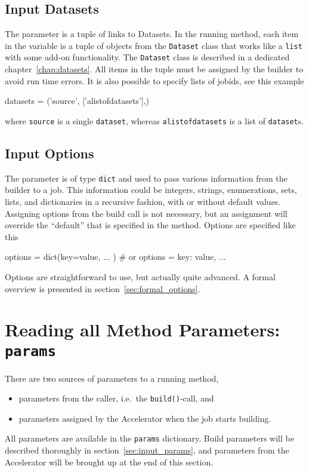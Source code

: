 \subsection*{Input Datasets}
The \datasets parameter is a tuple of links to Datasets.  In the
running method, each item in the \datasets variable is a tuple of
objects from the \texttt{Dataset} class that works like
a \texttt{list} with some add-on functionality.  The \texttt{Dataset}
class is described in a dedicated chapter~\ref{chap:datasets}.
All items in the \datasets tuple must be assigned by the builder to
avoid run time errors.
It is also possible to specify lists of jobids, see this example
\begin{python}
datasets = ('source', ['alistofdatasets'],)
\end{python}
where \texttt{source} is a single \texttt{dataset}, whereas
\texttt{alistofdatasets} is a list of \texttt{dataset}s.




\subsection*{Input Options}

The \options parameter is of type \texttt{dict} and used to pass
various information from the builder to a job.  This information could
be integers, strings, enumerations, sets, lists, and dictionaries in a
recursive fashion, with or without default values.  Assigning options
from the build call is not necessary, but an assignment will override
the ``default'' that is specified in the method.  Options are
specified like this
\begin{python}
  options = dict(key=value, ... )  # or
  options = {key: value, ...}
\end{python}

Options are straightforward to use, but actually quite advanced.  A
formal overview is presented in section~\ref{sec:formal_options}.





\section{Reading all Method Parameters:  \texttt{params}}
\label{sec:params}

There are two sources of parameters to a running method,
\begin{itemize}
\item [] parameters from the caller, i.e.\ the \texttt{build()}-call, and
\item [] parameters assigned by the Accelerator when the job starts building.
\end{itemize}
All parameters are available in the \texttt{params} dictionary.  Build
parameters will be described thoroughly in
section~\ref{sec:input_params}, and parameters from the Accelerator
will be brought up at the end of this section.

